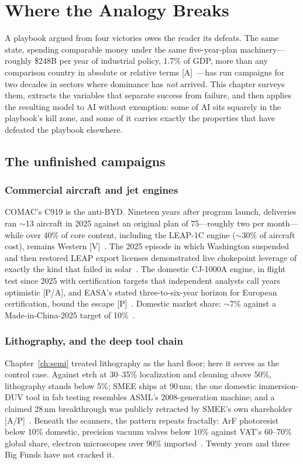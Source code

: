 \chapter{Where the Analogy Breaks}
\label{ch:analogy}

A playbook argued from four victories owes the reader its defeats. The same state, spending comparable money under the same five-year-plan machinery---roughly \$248B per year of industrial policy, 1.7\% of GDP, more than any comparison country in absolute or relative terms [A]~\cite{red-ink}---has run campaigns for two decades in sectors where dominance has \emph{not} arrived. This chapter surveys them, extracts the variables that separate success from failure, and then applies the resulting model to AI without exemption: some of AI sits squarely in the playbook's kill zone, and some of it carries exactly the properties that have defeated the playbook elsewhere.

\section{The unfinished campaigns}

\subsection{Commercial aircraft and jet engines}

COMAC's C919 is the anti-BYD. Nineteen years after program launch, deliveries ran $\sim$13 aircraft in 2025 against an original plan of 75---roughly two per month---while over 40\% of core content, including the LEAP-1C engine ($\sim$30\% of aircraft cost), remains Western [V]~\cite{comac}. The 2025 episode in which Washington suspended and then restored LEAP export licenses demonstrated live chokepoint leverage of exactly the kind that failed in solar~\cite{comac}. The domestic CJ-1000A engine, in flight test since 2025 with certification targets that independent analysts call years optimistic [P/A], and EASA's stated three-to-six-year horizon for European certification, bound the escape [P]~\cite{cj1000a,easa-c919}. Domestic market share: $\sim$7\% against a Made-in-China-2025 target of 10\%~\cite{self-sufficiency}.

\subsection{Lithography, and the deep tool chain}

Chapter~\ref{ch:semi} treated lithography as the hard floor; here it serves as the control case. Against etch at 30--35\% localization and cleaning above 50\%, lithography stands below 5\%; SMEE ships at 90\,nm; the one domestic immersion-DUV tool in fab testing resembles ASML's 2008-generation machine; and a claimed 28\,nm breakthrough was publicly retracted by SMEE's own shareholder [A/P]~\cite{litho-localization,litho}. Beneath the scanners, the pattern repeats fractally: ArF photoresist below 10\% domestic, precision vacuum valves below 10\% against VAT's 60--70\% global share, electron microscopes over 90\% imported~\cite{litho-localization,instruments}. Twenty years and three Big Funds have not cracked it.

